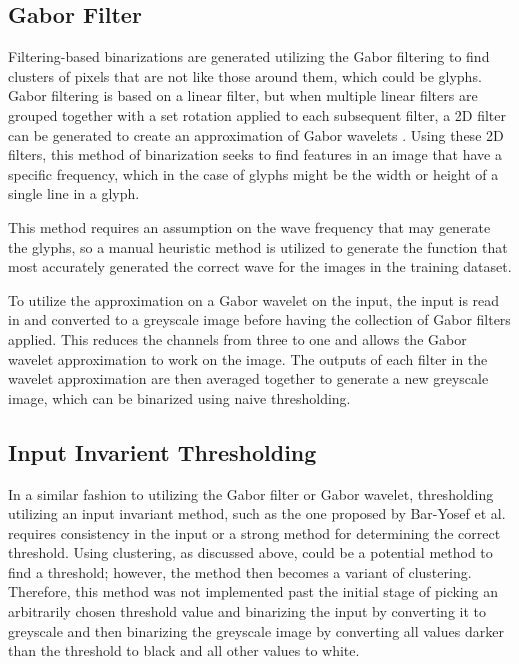 \subsection{Gabor Filter}

Filtering-based binarizations are generated utilizing the Gabor filtering  \cite{Gabor1949, Gabor1948} to find clusters of pixels that are not like those around them, which could be glyphs. Gabor filtering is based on a linear filter, but when multiple linear filters are grouped together with a set rotation applied to each subsequent filter, a 2D filter can be generated to create an approximation of Gabor wavelets \cite{Gabor1949, Gabor1948}. Using these 2D filters, this method of binarization seeks to find features in an image that have a specific frequency, which in the case of glyphs might be the width or height of a single line in a glyph.

This method requires an assumption on the wave frequency that may generate the glyphs, so a manual heuristic method is utilized to generate the function that most accurately generated the correct wave for the images in the training dataset.

To utilize the approximation on a Gabor wavelet on the input, the input is read in and converted to a greyscale image before having the collection of Gabor filters applied. This reduces the channels from three to one and allows the Gabor wavelet approximation to work on the image. The outputs of each filter in the wavelet approximation are then averaged together to generate a new greyscale image, which can be binarized using naive thresholding.

\subsection{Input Invarient Thresholding}

In a similar fashion to utilizing the Gabor filter or Gabor wavelet, thresholding utilizing an input invariant method, such as the one proposed by Bar-Yosef et al. \cite{Bar-Yosef2005, Bar-Yosef2007} requires consistency in the input or a strong method for determining the correct threshold. Using clustering, as discussed above, could be a potential method to find a threshold; however, the method then becomes a variant of clustering. Therefore, this method was not implemented past the initial stage of picking an arbitrarily chosen threshold value and binarizing the input by converting it to greyscale and then binarizing the greyscale image by converting all values darker than the threshold to black and all other values to white.

